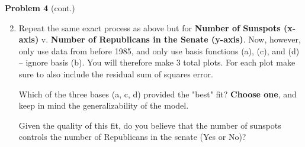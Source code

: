 \documentclass[submit]{harvardml}
\begin{document}
\begin{framed}
\noindent\textbf{Problem 4} (cont.)\\
\begin{enumerate}
\setcounter{enumi}{1}
\item Repeat the same exact process as above but for \textbf{Number of Sunspots (x-axis)} v. \textbf{Number of Republicans in the Senate (y-axis)}. 
Now, however, only use data from before 1985, and only use basis functions (a), (c), and (d) -- ignore basis (b). You will therefore make 3 total plots. For each plot make sure to also include the residual sum of squares error.



Which of the three bases (a, c, d) provided the "best" fit? \textbf{Choose one}, and keep in mind the generalizability of the model. 

Given the quality of this fit, do you believe that the number of sunspots controls the number of Republicans in the senate (Yes or No)?
\end{enumerate}
\end{framed}
\end{document}
